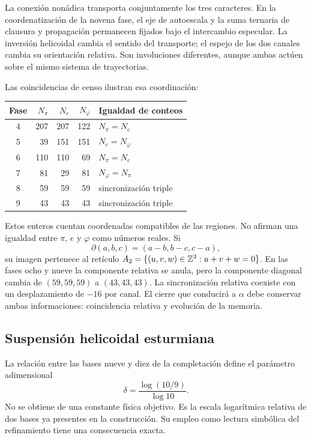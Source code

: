 La conexión nonádica transporta conjuntamente los tres caracteres. En la coordenatización de la novena fase, el eje de autoescala y la suma ternaria de clausura y propagación permanecen fijados bajo el intercambio especular. La inversión helicoidal cambia el sentido del transporte; el espejo de los dos canales cambia su orientación relativa. Son involuciones diferentes, aunque ambas actúen sobre el mismo sistema de trayectorias.

Las coincidencias de censo ilustran esa coordinación:
\begin{center}
\begin{tabular}{@{}c rrr l@{}}\toprule
Fase&\(N_\pi\)&\(N_e\)&\(N_\varphi\)&Igualdad de conteos\\\midrule
4&207&207&122&\(N_\pi=N_e\)\\
5&39&151&151&\(N_e=N_\varphi\)\\
6&110&110&69&\(N_\pi=N_e\)\\
7&81&29&81&\(N_\varphi=N_\pi\)\\
8&59&59&59&sincronización triple\\
9&43&43&43&sincronización triple\\\bottomrule
\end{tabular}
\end{center}
Estos enteros cuentan coordenadas compatibles de las regiones. No afirman una igualdad entre \(\pi\), \(e\) y \(\varphi\) como números reales. Si
\[
 \partial(a,b,c)=(a-b,b-c,c-a),
\]
su imagen pertenece al retículo \(A_2=\{(u,v,w)\in\mathbb Z^3:u+v+w=0\}\). En las fases ocho y nueve la componente relativa se anula, pero la componente diagonal cambia de \((59,59,59)\) a \((43,43,43)\). La sincronización relativa coexiste con un desplazamiento de \(-16\) por canal. El cierre que conducirá a \(\alpha\) debe conservar ambas informaciones: coincidencia relativa y evolución de la memoria.

\subsection{Suspensión helicoidal esturmiana}

La relación entre las bases nueve y diez de la completación define el parámetro adimensional
\begin{equation}
 \delta=\frac{\log(10/9)}{\log10}.
 \label{eq:delta-sturm}
\end{equation}
No se obtiene de una constante física objetivo. Es la escala logarítmica relativa de dos bases ya presentes en la construcción. Su empleo como lectura simbólica del refinamiento tiene una consecuencia exacta.

